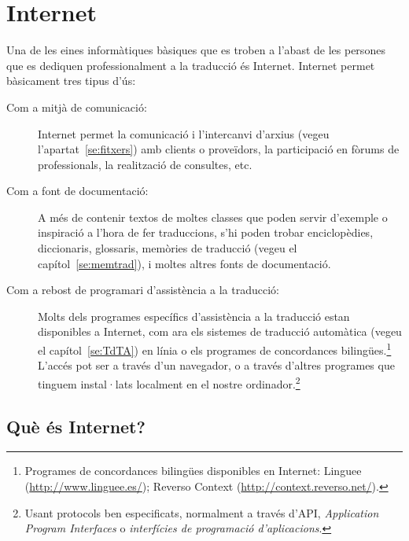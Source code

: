  \chapter{Internet}
\label{se:Internet}

Una de les eines informàtiques bàsiques que es troben a l'abast de les
persones que es dediquen professionalment a la traducció és
Internet. Internet permet bàsicament tres tipus d'ús:
\begin{description}
\item[Com a mitjà de comunicació:] Internet permet la comunicació i
  l'intercanvi d'arxius (vegeu l'apartat~\ref{se:fitxers}) amb clients
  o proveïdors, la participació en fòrums de professionals, la
  realització de consultes, etc.
\item[Com a font de documentació:] A més de contenir textos de moltes
  classes que poden servir d'exemple o inspiració a l'hora de fer
  traduccions, s'hi poden trobar enciclopèdies, diccionaris,
  glossaris, memòries de traducció (vegeu el
  capítol~\ref{se:memtrad}), i moltes altres fonts de documentació.
\item[Com a rebost de programari d'assistència a la traducció:] Molts
  dels programes específics d'assistència a la traducció estan
  disponibles a Internet, com ara els sistemes de traducció automàtica
  (vegeu el capítol~\ref{se:TdTA}) en línia o els programes de
  concordances bilingües.\footnote{Programes de concordances bilingües
    disponibles en Internet: Linguee (\url{http://www.linguee.es/});
    Reverso Context (\url{http://context.reverso.net/}).} L'accés pot
  ser a través d'un navegador, o a través d'altres programes que
  tinguem instal·lats localment en el nostre ordinador.\footnote{Usant
    protocols ben especificats, normalment a través d'API,
    \emph{Application Program Interfaces} o \emph{interfícies de
      programació d'aplicacions}.}
\end{description}

\section{Què és Internet?}

